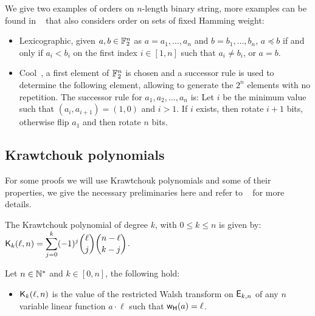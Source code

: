 \documentclass[11pt]{llncs}
\begin{document}
We give two examples of orders on $n$-length binary string, more examples can be found in \eg ~\cite{FUN:SteWil12} that also considers order on sets of fixed Hamming weight:
\begin{itemize}
	\item Lexicographic, given $a,b \in \mathbb{F}_2^n$ as $a=a_1,\ldots, a_n$ and $b=b_1,\ldots,b_n$, $a\preceq b$ if and only if  $a_i<b_i$ on the first index $i\in [1,n]$ such that $a_i\ne b_i$, or $a=b$.
\item Cool~\cite{DM:RukWil09}, a first element of $\mathbb{F}_2^n$ is chosen and a successor rule is used to determine the following element, allowing to generate the $2^n$ elements with no repetition. The successor rule for $a_1,a_2,\ldots,a_n$ is: Let $i$ be the minimum value such that $(a_i,a_{i+1})=(1,0)$ and $i>1$. If $i$ exists, then rotate $i+1$ bits, otherwise flip $a_1$ and then rotate $n$ bits. 

\end{itemize}

\subsection{Krawtchouk polynomials}
For some proofs we will use Krawtchouk polynomials and some of their properties, we give the necessary preliminaries here and refer to \eg ~\cite{book:MacSlo78} for more details.

\begin{definition}\label{def:Kraw}
	The Krawtchouk polynomial of degree $k$, with $0\leq k\leq n$ is given by: $ \displaystyle \mathsf{K}_{k}(\ell,n)=\sum_{j=0}^{k} (-1)^j \binom{\ell}{j} \binom{n-\ell}{k-j}$. 
\end{definition}


\begin{Prop}\label{prop:Kr}
	Let $n\in \mathbb{N}^*$ and $k\in [0,n]$, the following hold:
	\begin{itemize}
		\item $\mathsf{K}_{k}(\ell,n)$ is the value of the restricted Walsh transform on $\mathsf{E}_{k,n}$ of any $n$ variable linear function $a\cdot \ell$ such that $\mathsf{w_H}(a)=\ell$.
	\end{itemize}	
\end{Prop}
\end{document}
